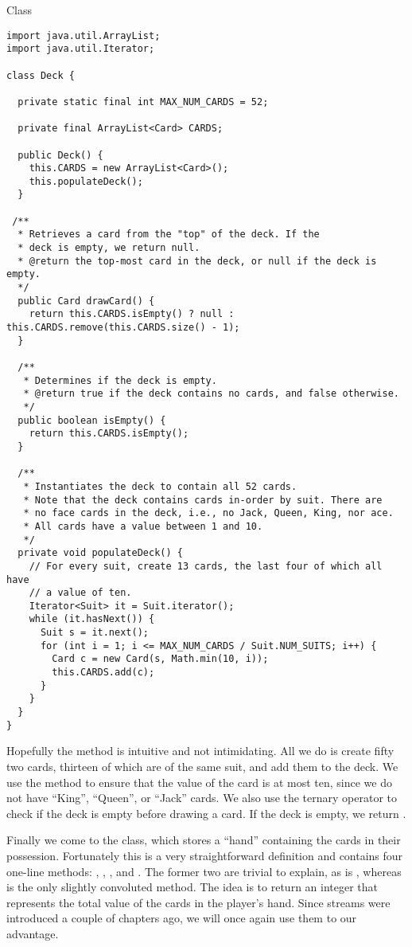 \begin{cl}[]{ Class}
\begin{lstlisting}[language=MyJava]
import java.util.ArrayList;
import java.util.Iterator;

class Deck {

  private static final int MAX_NUM_CARDS = 52;

  private final ArrayList<Card> CARDS;

  public Deck() {
    this.CARDS = new ArrayList<Card>();
    this.populateDeck();
  }

 /**
  * Retrieves a card from the "top" of the deck. If the
  * deck is empty, we return null.
  * @return the top-most card in the deck, or null if the deck is empty.
  */
  public Card drawCard() {
    return this.CARDS.isEmpty() ? null : this.CARDS.remove(this.CARDS.size() - 1);
  }

  /**
   * Determines if the deck is empty.
   * @return true if the deck contains no cards, and false otherwise.
   */
  public boolean isEmpty() { 
    return this.CARDS.isEmpty(); 
  }

  /**
   * Instantiates the deck to contain all 52 cards.
   * Note that the deck contains cards in-order by suit. There are 
   * no face cards in the deck, i.e., no Jack, Queen, King, nor ace.
   * All cards have a value between 1 and 10.
   */
  private void populateDeck() {
    // For every suit, create 13 cards, the last four of which all have
    // a value of ten.
    Iterator<Suit> it = Suit.iterator();
    while (it.hasNext()) {
      Suit s = it.next();
      for (int i = 1; i <= MAX_NUM_CARDS / Suit.NUM_SUITS; i++) {
        Card c = new Card(s, Math.min(10, i));
        this.CARDS.add(c);
      }
    }
  }
}
\end{lstlisting}
\end{cl}

Hopefully the  method is intuitive and not intimidating. All we do is create fifty two cards, thirteen of which are of the same suit, and add them to the deck. We use the  method to ensure that the value of the card is at most ten, since we do not have ``King'', ``Queen'', or ``Jack'' cards. We also use the ternary operator to check if the deck is empty before drawing a card. If the deck is empty, we return .

Finally we come to the  class, which stores a ``hand'' containing the cards in their possession. Fortunately this is a very straightforward definition and contains four one-line methods: , , , and . The former two are trivial to explain, as is , whereas  is the only slightly convoluted method. The idea is to return an integer that represents the total value of the cards in the player's hand. Since streams were introduced a couple of chapters ago, we will once again use them to our advantage.

